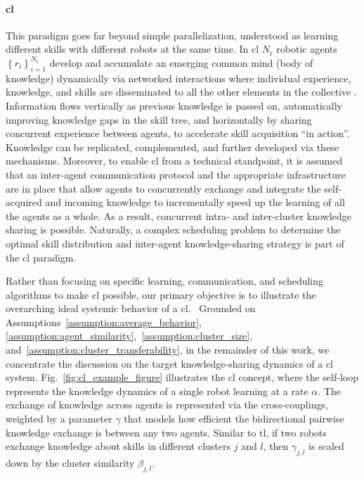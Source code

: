 \documentclass[12pt]{article}
\begin{document}

\paragraph*{\textbf{\Acl{cl}}}
This paradigm goes far beyond simple parallelization, understood as learning different skills with different robots at the same time. In \ac{cl} $N_\mathrm{r}$ robotic agents $ \left\lbrace r_i \right\rbrace_{i=1}^{N_\mathrm{r}} $ develop and accumulate an emerging common mind (body of knowledge) dynamically via networked interactions where individual experience, knowledge, and skills are disseminated to all the other elements in the collective \cite{Garavan2012CollectiveLearning}. Information flows vertically as previous knowledge is passed on, automatically improving knowledge gaps in the skill tree, and horizontally by sharing concurrent experience between agents, to accelerate skill acquisition ``in action''. Knowledge can be replicated, complemented, and further developed via these mechanisms. Moreover, to enable \ac{cl} from a technical standpoint, it is assumed that an inter-agent communication protocol and the appropriate infrastructure are in place that allow agents to concurrently exchange and integrate the self-acquired and incoming knowledge to incrementally speed up the learning of all the agents as a whole. As a result, concurrent intra- and inter-cluster knowledge sharing is possible. Naturally, a complex scheduling problem to determine the optimal skill distribution and inter-agent knowledge-sharing strategy is part of the \ac{cl} paradigm. 

Rather than focusing on specific learning, communication, and scheduling algorithms to make \ac{cl} possible, our primary objective is to illustrate the overarching ideal systemic behavior of a \acl{cl}.~%
Grounded on Assumptions~\ref{assumption:average_behavior}, \ref{assumption:agent_similarity},~\ref{assumption:cluster_size}, and~\ref{assumption:cluster_transferability}, in the remainder of this work, we concentrate the discussion on the target knowledge-sharing dynamics of a \ac{cl} system. Fig.~\ref{fig:cl_example_figure} illustrates the \ac{cl} concept, where the self-loop represents the knowledge dynamics of a single robot learning at a rate $\alpha$. The exchange of knowledge across agents is represented via the cross-couplings, weighted by a parameter $\gamma$ that models how efficient the bidirectional pairwise knowledge exchange is between any two agents. Similar to \ac{tl}, if two robots exchange knowledge about skills in different clusters $j$ and $l$, then $\gamma_{j,l}$ is scaled down by the cluster similarity $\beta_{j,l}$. 
\end{document}
